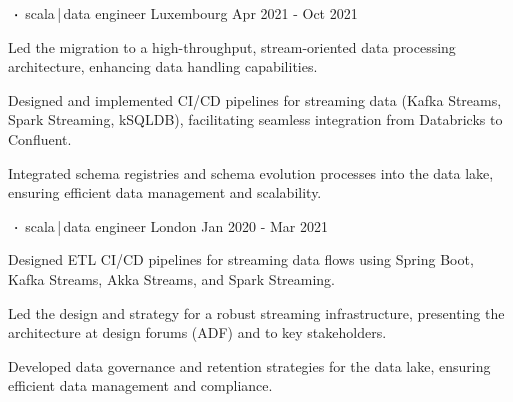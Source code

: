 \begin{cventries}

    \cventry
    {     }
    {$\sqbig$scala\,|\,data engineer}
    {Luxembourg}
    {Apr 2021 - Oct 2021}
    {}
    {
        \begin{cvitems}
            \item{Led the migration to a high-throughput, stream-oriented data processing architecture, enhancing data handling capabilities.}
            \item{Designed and implemented CI/CD pipelines for streaming data (Kafka Streams, Spark Streaming, kSQLDB), facilitating seamless integration from Databricks to Confluent.}
            \item{Integrated schema registries and schema evolution processes into the data lake, ensuring efficient data management and scalability.}
        \end{cvitems}
    }

    \cventry
    {      }
    {$\sqbig$scala\,|\,data engineer}
    {London}
    {Jan 2020 - Mar 2021}
    {}
    {
        \begin{cvitems}
            \item{Designed ETL CI/CD pipelines for streaming data flows using Spring Boot, Kafka Streams, Akka Streams, and Spark Streaming.}
            \item{Led the design and strategy for a robust streaming infrastructure, presenting the architecture at design forums (ADF) and to key stakeholders.}
            \item{Developed data governance and retention strategies for the data lake, ensuring efficient data management and compliance.}
        \end{cvitems}
    }


\end{cventries}
